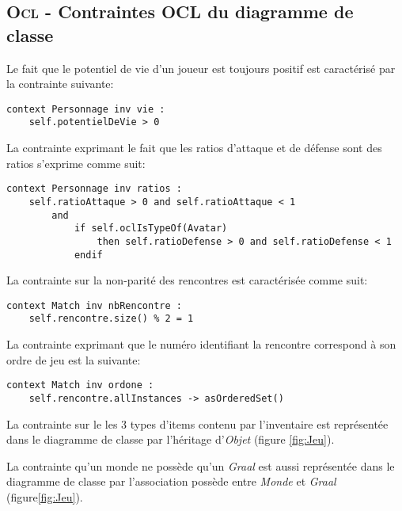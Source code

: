 
\subsection{\textsc{Ocl} - Contraintes OCL du diagramme de classe}
\label{sec:question-4}


Le fait que le potentiel de vie d'un joueur est toujours positif est caractérisé par la contrainte suivante:

\begin{lstlisting}[caption=Contrainte sur le potentiel de vie,captionpos=b,label={lst:vie},language=OCL]
context Personnage inv vie :
	self.potentielDeVie > 0
\end{lstlisting}

La contrainte exprimant le fait que les ratios d'attaque et de défense sont des ratios s'exprime comme suit:

\begin{lstlisting}[caption=Contrainte sur les ratios,captionpos=b,label={lst:ratios},language=OCL]
context Personnage inv ratios :
	self.ratioAttaque > 0 and self.ratioAttaque < 1
		and
			if self.oclIsTypeOf(Avatar)
				then self.ratioDefense > 0 and self.ratioDefense < 1
			endif
\end{lstlisting}

La contrainte sur la non-parité des rencontres est caractérisée comme suit:

\begin{lstlisting}[caption=Contrainte sur la non-parité des rencontres,captionpos=b,label={lst:impair},language=OCL]
context Match inv nbRencontre :
	self.rencontre.size() % 2 = 1
\end{lstlisting}

La contrainte exprimant que le numéro identifiant la rencontre correspond à son ordre de jeu est la suivante:

\begin{lstlisting}[caption=Contrainte sur l'ordre des rencontres,captionpos=b,label={lst:ordreRencontres},language=OCL]
context Match inv ordone :
	self.rencontre.allInstances -> asOrderedSet()
\end{lstlisting}

La contrainte sur le les 3 types d'items contenu par l'inventaire est représentée dans le diagramme de classe par l'héritage d'\emph{Objet} (figure \ref{fig:Jeu}).

La contrainte qu'un monde ne possède qu'un \emph{Graal} est aussi représentée dans le diagramme de classe par l'association possède entre \emph{Monde} et \emph{Graal} (figure\ref{fig:Jeu}).

